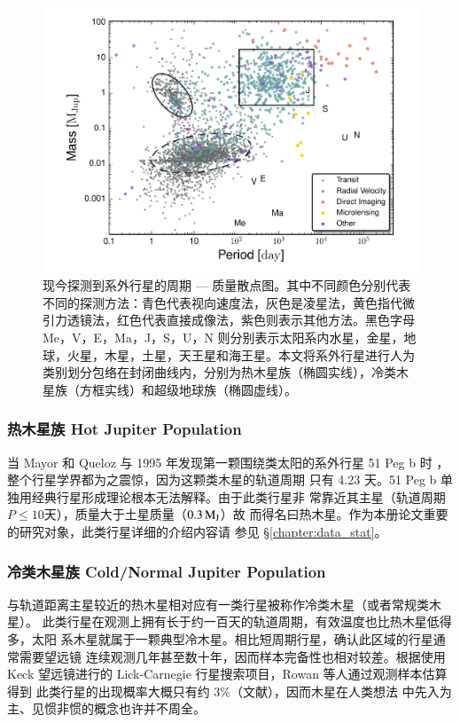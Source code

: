 \begin{figure}[t]
\centering
\includegraphics[width=1.0\textwidth]{figures/chapter1/fig13_exompplot.pdf}
\caption{现今探测到系外行星的周期 --- 质量散点图。其中不同颜色分别代表不同的探测方法：青色代表视向速度法，灰色是凌星法，黄色指代微引力透镜法，红色代表直接成像法，紫色则表示其他方法。黑色字母 Me，V，E，Ma，J，S，U，N 则分别表示太阳系内水星，金星，地球，火星，木星，土星，天王星和海王星。本文将系外行星进行人为类别划分包络在封闭曲线内，分别为热木星族（椭圆实线），冷类木星族（方框实线）和超级地球族（椭圆虚线）。}
\label{fig:exomassper}
\end{figure}

\subsubsection{热木星族 Hot Jupiter Population}

当 Mayor 和 Queloz 与 1995 年发现第一颗围绕类太阳的系外行星 51 Peg b 时
\cite{MayorQueloz1995}，整个行星学界都为之震惊，因为这颗类木星的轨道周期
只有 4.23 天。51 Peg b 单独用经典行星形成理论根本无法解释。由于此类行星非
常靠近其主星（轨道周期 $P \le10 $天），质量大于土星质量（$0.3\,\mathrm{M}_\mathrm{J}$）故
而得名曰热木星。作为本册论文重要的研究对象，此类行星详细的介绍内容请
参见 \S \ref{chapter:data_stat}。


\subsubsection{冷类木星族  Cold/Normal Jupiter Population}

与轨道距离主星较近的热木星相对应有一类行星被称作冷类木星（或者常规类木星）。
此类行星在观测上拥有长于约一百天的轨道周期，有效温度也比热木星低得多，太阳
系木星就属于一颗典型冷木星。相比短周期行星，确认此区域的行星通常需要望远镜
连续观测几年甚至数十年，因而样本完备性也相对较差\cite{Cumming2008}。根据使用
 Keck 望远镜进行的 Lick-Carnegie 行星搜索项目，Rowan 等人通过观测样本估算得到
此类行星的出现概率大概只有约 3\%（文献），因而木星在人类想法
中先入为主、见惯非惯的概念也许并不周全。

